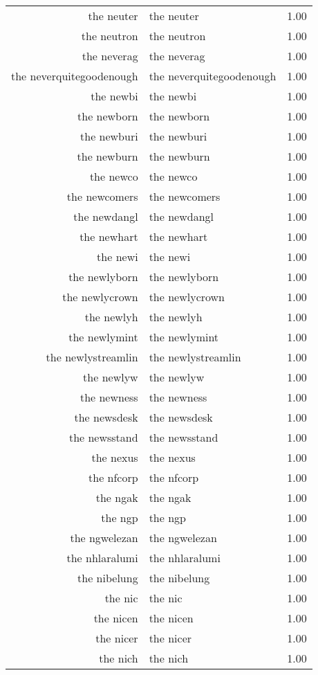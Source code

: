 \begin{table}[ht]
\begin{tabular}{rlr}
  the neuter & the neuter & 1.00 \\ 
  the neutron & the neutron & 1.00 \\ 
  the neverag & the neverag & 1.00 \\ 
  the neverquitegoodenough & the neverquitegoodenough & 1.00 \\ 
  the newbi & the newbi & 1.00 \\ 
  the newborn & the newborn & 1.00 \\ 
  the newburi & the newburi & 1.00 \\ 
  the newburn & the newburn & 1.00 \\ 
  the newco & the newco & 1.00 \\ 
  the newcomers & the newcomers & 1.00 \\ 
  the newdangl & the newdangl & 1.00 \\ 
  the newhart & the newhart & 1.00 \\ 
  the newi & the newi & 1.00 \\ 
  the newlyborn & the newlyborn & 1.00 \\ 
  the newlycrown & the newlycrown & 1.00 \\ 
  the newlyh & the newlyh & 1.00 \\ 
  the newlymint & the newlymint & 1.00 \\ 
  the newlystreamlin & the newlystreamlin & 1.00 \\ 
  the newlyw & the newlyw & 1.00 \\ 
  the newness & the newness & 1.00 \\ 
  the newsdesk & the newsdesk & 1.00 \\ 
  the newsstand & the newsstand & 1.00 \\ 
  the nexus & the nexus & 1.00 \\ 
  the nfcorp & the nfcorp & 1.00 \\ 
  the ngak & the ngak & 1.00 \\ 
  the ngp & the ngp & 1.00 \\ 
  the ngwelezan & the ngwelezan & 1.00 \\ 
  the nhlaralumi & the nhlaralumi & 1.00 \\ 
  the nibelung & the nibelung & 1.00 \\ 
  the nic & the nic & 1.00 \\ 
  the nicen & the nicen & 1.00 \\ 
  the nicer & the nicer & 1.00 \\ 
  the nich & the nich & 1.00 \\ 

\end{tabular}
\end{table}
